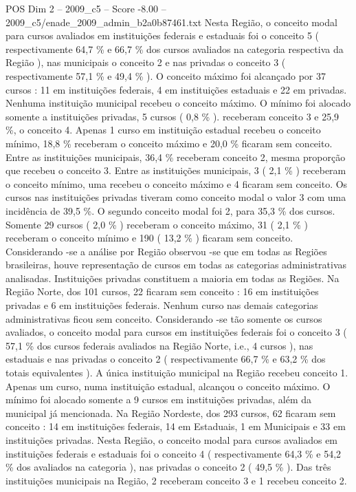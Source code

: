 \begin{textsample}{POS Dim 2 – 2009\_c5 – Score -8.00 – 2009\_c5/enade\_2009\_admin\_b2a0b87461.txt}
Nesta Região, o conceito modal para cursos avaliados em instituições federais e estaduais foi o conceito 5 ( respectivamente 64,7 \% e 66,7 \% dos cursos avaliados na categoria respectiva da Região ), nas municipais o conceito 2 e nas privadas o conceito 3 ( respectivamente 57,1 \% e 49,4 \% ).
O conceito máximo foi alcançado por 37 cursos : 11 em instituições federais, 4 em instituições estaduais e 22 em privadas.
Nenhuma instituição municipal recebeu o conceito máximo.
O mínimo foi alocado somente a instituições privadas, 5 cursos ( 0,8 \% ). receberam conceito 3 e 25,9 \%, o conceito 4.
Apenas 1 curso em instituição estadual recebeu o conceito mínimo, 18,8 \% receberam o conceito máximo e 20,0 \% ficaram sem conceito.
Entre as instituições municipais, 36,4 \% receberam conceito 2, mesma proporção que recebeu o conceito 3.
Entre as instituições municipais, 3 ( 2,1 \% ) receberam o conceito mínimo, uma recebeu o conceito máximo e 4 ficaram sem conceito.
Os cursos nas instituições privadas tiveram como conceito modal o valor 3 com uma incidência de 39,5 \%.
O segundo conceito modal foi 2, para 35,3 \% dos cursos.
Somente 29 cursos ( 2,0 \% ) receberam o conceito máximo, 31 ( 2,1 \% ) receberam o conceito mínimo e 190 ( 13,2 \% ) ficaram sem conceito.
Considerando -se a análise por Região observou -se que em todas as Regiões brasileiras, houve representação de cursos em todas as categorias administrativas analisadas.
Instituições privadas constituem a maioria em todas as Regiões.
Na Região Norte, dos 101 cursos, 22 ficaram sem conceito : 16 em instituições privadas e 6 em instituições federais.
Nenhum curso nas demais categorias administrativas ficou sem conceito.
Considerando -se tão somente os cursos avaliados, o conceito modal para cursos em instituições federais foi o conceito 3 ( 57,1 \% dos cursos federais avaliados na Região Norte, i.e., 4 cursos ), nas estaduais e nas privadas o conceito 2 ( respectivamente 66,7 \% e 63,2 \% dos totais equivalentes ).
A única instituição municipal na Região recebeu conceito 1.
Apenas um curso, numa instituição estadual, alcançou o conceito máximo.
O mínimo foi alocado somente a 9 cursos em instituições privadas, além da municipal já mencionada.
Na Região Nordeste, dos 293 cursos, 62 ficaram sem conceito : 14 em instituições federais, 14 em Estaduais, 1 em Municipais e 33 em instituições privadas.
Nesta Região, o conceito modal para cursos avaliados em instituições federais e estaduais foi o conceito 4 ( respectivamente 64,3 \% e 54,2 \% dos avaliados na categoria ), nas privadas o conceito 2 ( 49,5 \% ).
Das três instituições municipais na Região, 2 receberam conceito 3 e 1 recebeu conceito 2.

\end{textsample}
